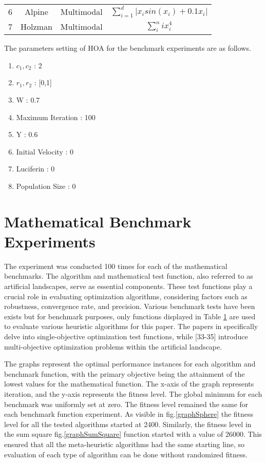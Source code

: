\documentclass[conference]{IEEEtran}
\begin{document}
\begin{abstract1}
\begin{center}
\begin{table}
\begin{tabular}{ |c|c|c|c| }
			\rule{0pt}{15pt} 
		6 & Alpine & Multimodal &  $\sum_{i=1}^{d}|x_isin(x_i)+0.1x_i|$   \\
			\rule{0pt}{15pt}
		7 & Holzman & Multimodal & $\sum_{i}^{n} ix_i^4$  \\ 
	
		
		\hline
	\end{tabular}
	\label{tab:Mathbenchmark}
	\end{table}
\end{center}

The parameters setting of HOA for the benchmark experiments are as follows.

\begin{enumerate}
	\item $c_1,c_2$ : 2
	\item $r_1, r_2$ : [0,1]
	\item W : 0.7
	\item Maximum Iteration : 100
	\item Y : 0.6
	\item Initial Velocity : 0
	\item Luciferin : 0
	\item Population Size : 0
\end{enumerate}




\section{Mathematical Benchmark Experiments}

The experiment was conducted 100 times for each of the mathematical benchmarks. The algorithm and mathematical test function, also referred to as artificial landscapes, serve as essential components. These test functions play a crucial role in evaluating optimization algorithms, considering factors such as robustness, convergence rate, and precision. Various benchmark tests have been exists but for benchmark purposes, only functions displayed in  Table \ref{tab:Mathbenchmark} are used to evaluate various heuristic algorithms for this paper. The papers in \cite{back1996evolutionary, Haupt2004} specifically delve into single-objective optimization test functions, while \cite{Hanne2000,To1997,Binh1999 } [33-35] introduce multi-objective optimization problems within the artificial landscape. 

The graphs represent the optimal performance instances for each algorithm and benchmark function, with the primary objective being the attainment of the lowest values for the mathematical function. The x-axis of the graph represents iteration, and the y-axis represents the fitness level. The global minimum for each benchmark was uniformly set at zero. The fitness level remained the same for each benchmark function experiment. As visible in fig.\ref{graphSphere} the fitness level for all the tested algorithms started at 2400. Similarly, the fitness level in the sum square fig.\ref{graphSumSquare} function started with a value of 26000. This ensured that all the meta-heuristic algorithms had the same starting line, so evaluation of each type of algorithm can be done without randomized fitness.



\end{abstract1}
\end{document}
